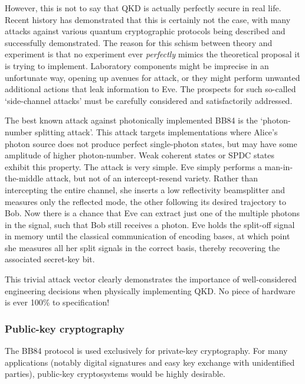 However, this is not to say that QKD is actually perfectly secure in real life. Recent history has demonstrated that this is certainly not the case, with many attacks against various quantum cryptographic protocols being described and successfully demonstrated. The reason for this schism between theory and experiment is that no experiment ever \textit{perfectly} mimics the theoretical proposal it is trying to implement. Laboratory components might be imprecise in an unfortunate way, opening up avenues for attack, or they might perform unwanted additional actions that leak information to Eve. The prospects for such so-called `side-channel attacks' must be carefully considered and satisfactorily addressed.

The best known attack against photonically implemented BB84 is the `photon-number splitting attack'. This attack targets implementations where Alice's photon source does not produce perfect single-photon states, but may have some amplitude of higher photon-number. Weak coherent states or SPDC states exhibit this property. The attack is very simple. Eve simply performs a man-in-the-middle attack, but not of an intercept-resend variety. Rather than intercepting the entire channel, she inserts a low reflectivity beamsplitter and measures only the reflected mode, the other following its desired trajectory to Bob. Now there is a chance that Eve can extract just one of the multiple photons in the signal, such that Bob still receives a photon. Eve holds the split-off signal in memory until the classical communication of encoding bases, at which point she measures all her split signals in the correct basis, thereby recovering the associated secret-key bit.

This trivial attack vector clearly demonstrates the importance of well-considered engineering decisions when physically implementing QKD. No piece of hardware is ever 100\% to specification!

\subsubsection{Public-key cryptography}

The BB84 protocol is used exclusively for private-key cryptography. For many applications (notably digital signatures and easy key exchange with unidentified parties), public-key cryptosystems would be highly desirable.

